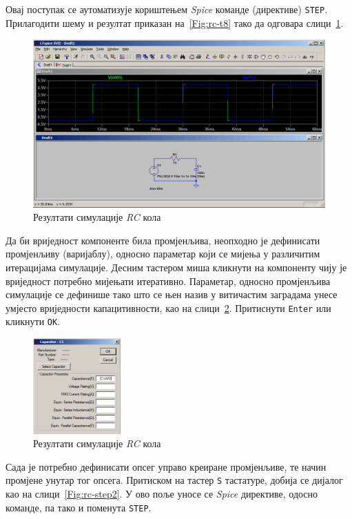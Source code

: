 Овај поступак се аутоматизује кориштењем \textit{Spice} команде (директиве) \texttt{STEP}. Прилагодити шему и резултат приказан на~\ref{Fig:rc-t8} тако да одговара слици~\ref{Fig:rc-step0}.

\begin{figure}[h]
\centering
\includegraphics[width=\figwidth\textwidth]{figs/rc-step0.PNG}
\caption{Резултати симулације \textit{RC} кола}
\label{Fig:rc-step0}
\end{figure}

Да би вриједност компоненте била промјенљива, неопходно је дефинисати промјенљиву (варијаблу), односно параметар који се мијења у различитим итерацијама симулације. Десним тастером миша кликнути на компоненту чију је вриједност потребно мијењати итеративно. Параметар, односно промјенљива симулације се дефинише тако што се њен назив у витичастим заградама унесе умјесто вриједности капацитивности, као на слици~\ref{Fig:rc-step1}. Притиснути \texttt{Enter} или кликнути \texttt{OK}.

\begin{figure}[h]
\centering
\includegraphics[width=0.3\textwidth]{figs/rc-step1.PNG}
\caption{Резултати симулације \textit{RC} кола}
\label{Fig:rc-step1}
\end{figure}

Сада је потребно дефинисати опсег управо креиране промјенљиве, те начин промјене унутар тог опсега. Притиском на тастер \texttt{S} тастатуре, добија се дијалог као на слици~\ref{Fig:rc-step2}. У ово поље уносе се \textit{Spice} директиве, одосно команде, па тако и поменута \texttt{STEP}. 

